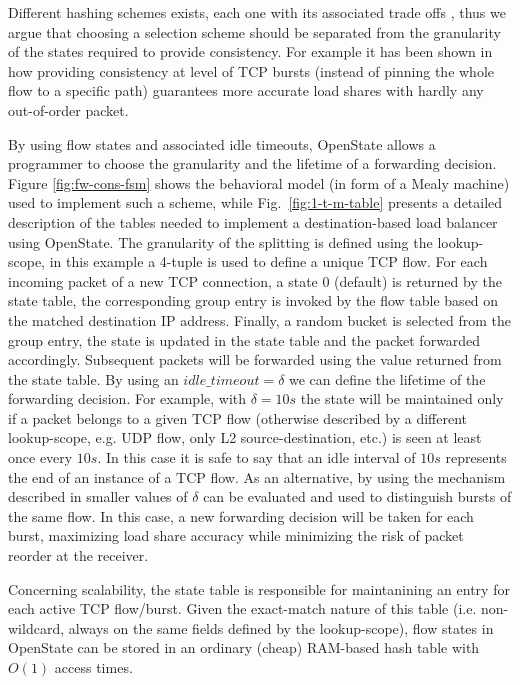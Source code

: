 \documentclass[10pt,conference]{IEEEtran}
\begin{document}
Different hashing schemes exists, each one with its associated trade offs \cite{Zhi00}, thus we argue that choosing a selection scheme should be separated from the granularity of the states required to provide consistency. For example it has been shown in \cite{kandula07} how providing consistency at level of TCP bursts (instead of pinning the whole flow to a specific path) guarantees more accurate load shares with hardly any out-of-order packet.

By using flow states and associated idle timeouts, OpenState allows a programmer to choose the granularity and the lifetime of a forwarding decision. Figure \ref{fig:fw-cons-fsm} shows the behavioral model (in form of a Mealy machine) used to implement such a scheme, while Fig.~\ref{fig:1-t-m-table} presents a detailed description of the tables needed to implement a destination-based load balancer using OpenState. The granularity of the splitting is defined using the lookup-scope, in this example a 4-tuple is used to define a unique TCP flow. For each incoming packet of a new TCP connection, a state 0 (default) is returned by the state table, the corresponding group entry is invoked by the flow table based on the matched destination IP address. Finally, a random bucket is selected from the group entry, the state is updated in the state table and the packet forwarded accordingly. Subsequent packets will be forwarded using the value returned from the state table. By using an $idle\_timeout = \delta$ we can define the lifetime of the forwarding decision. For example, with $\delta=10s$ the state will be maintained only if a packet belongs to a given TCP flow (otherwise described by a different lookup-scope, e.g. UDP flow, only L2 source-destination, etc.) is seen at least once every $10s$. In this case it is safe to say that an idle interval of $10s$ represents the end of an instance of a TCP flow. As an alternative, by using the mechanism described in \cite{kandula07} smaller values of $\delta$ can be evaluated and used to distinguish bursts of the same flow. In this case, a new forwarding decision will be taken for each burst, maximizing load share accuracy while minimizing the risk of packet reorder at the receiver.

Concerning scalability, the state table is responsible for maintanining an entry for each active TCP flow/burst. Given the exact-match nature of this table (i.e. non-wildcard, always on the same fields defined by the lookup-scope), flow states in OpenState can be stored in an ordinary (cheap) RAM-based hash table with $O(1)$ access times. 
\end{document}
